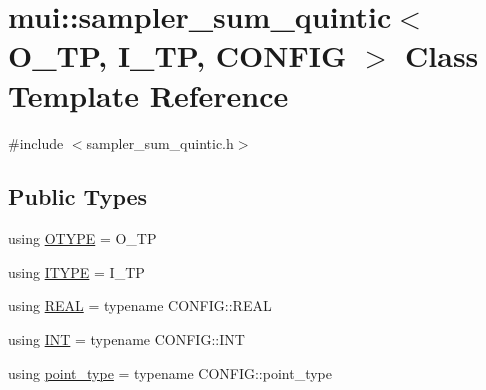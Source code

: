 \hypertarget{classmui_1_1sampler__sum__quintic}{}\section{mui\+:\+:sampler\+\_\+sum\+\_\+quintic$<$ O\+\_\+\+TP, I\+\_\+\+TP, C\+O\+N\+F\+IG $>$ Class Template Reference}
\label{classmui_1_1sampler__sum__quintic}


{\ttfamily \#include $<$sampler\+\_\+sum\+\_\+quintic.\+h$>$}

\subsection*{Public Types}
\begin{DoxyCompactItemize}
\item 
using \hyperlink{classmui_1_1sampler__sum__quintic_a524db204f563b4f3d1eedded2e39ba8b}{O\+T\+Y\+PE} = O\+\_\+\+TP
\item 
using \hyperlink{classmui_1_1sampler__sum__quintic_aefb0c5d19f1e834ee9d4c41efe31d222}{I\+T\+Y\+PE} = I\+\_\+\+TP
\item 
using \hyperlink{classmui_1_1sampler__sum__quintic_a9cbbc0e8f2384abe39ec2339229b64b6}{R\+E\+AL} = typename C\+O\+N\+F\+I\+G\+::\+R\+E\+AL
\item 
using \hyperlink{classmui_1_1sampler__sum__quintic_a64a01190b668aa6a66149c1f74da1e34}{I\+NT} = typename C\+O\+N\+F\+I\+G\+::\+I\+NT
\item 
using \hyperlink{classmui_1_1sampler__sum__quintic_a661c2038a21043ac8e41beeeb07978ad}{point\+\_\+type} = typename C\+O\+N\+F\+I\+G\+::point\+\_\+type
\end{DoxyCompactItemize}
